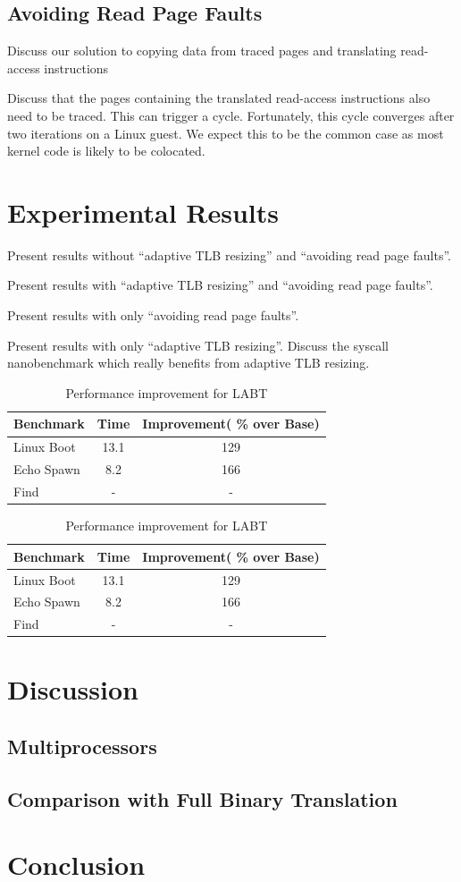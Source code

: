 \documentclass[10pt,twocolumn]{article}
\begin{document}
\subsection{Avoiding Read Page Faults}
Discuss our solution to copying data from traced pages and translating read-access
instructions

Discuss that the pages containing the translated read-access instructions also need
to be traced. This can trigger a cycle. Fortunately, this cycle converges after
two iterations on a Linux guest. We expect this to be the common case as most kernel code
is likely to be colocated.

\section{Experimental Results}
\label{sec:results}
Present results without ``adaptive TLB resizing'' and ``avoiding read page faults''.

Present results with ``adaptive TLB resizing'' and ``avoiding read page faults''.

Present results with only ``avoiding read page faults''.

Present results with only ``adaptive TLB resizing''. Discuss the syscall nanobenchmark
which really benefits from adaptive TLB resizing.

\begin{table}[!b]
\centering
\caption{Performance improvement for LABT}
     \begin{tabular}{lcc} \hline
       Benchmark  & Time & Improvement( \% over Base)  \\ \hline
       Linux Boot & 13.1 & 129  \\
       Echo Spawn & 8.2 & 166  \\
       Find & - & -  \\
       \hline
     \end{tabular}
\label{tab:ExpWithout1}
\end{table}

\begin{table}[!b]
\centering
\caption{Performance improvement for LABT}
     \begin{tabular}{lcc} \hline
       Benchmark  & Time & Improvement( \% over Base)  \\ \hline
       Linux Boot & 13.1 & 129  \\
       Echo Spawn & 8.2 & 166  \\
       Find & - & -  \\
       \hline
     \end{tabular}
\label{tab:ExpWithout2}
\end{table}

\section{Discussion}
\subsection{Multiprocessors}
\subsection{Comparison with Full Binary Translation}
\section{Conclusion}



\end{document}
